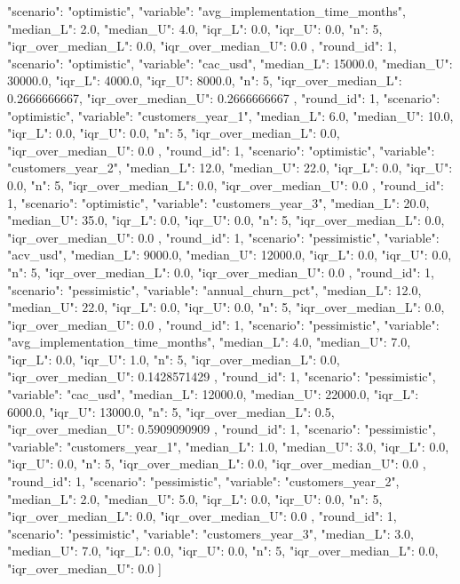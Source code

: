 \begin{APACode}
{    "scenario": "optimistic",
    "variable": "avg_implementation_time_months",
    "median_L": 2.0,
    "median_U": 4.0,
    "iqr_L": 0.0,
    "iqr_U": 0.0,
    "n": 5,
    "iqr_over_median_L": 0.0,
    "iqr_over_median_U": 0.0
  },
  {
    "round_id": 1,
    "scenario": "optimistic",
    "variable": "cac_usd",
    "median_L": 15000.0,
    "median_U": 30000.0,
    "iqr_L": 4000.0,
    "iqr_U": 8000.0,
    "n": 5,
    "iqr_over_median_L": 0.2666666667,
    "iqr_over_median_U": 0.2666666667
  },
  {
    "round_id": 1,
    "scenario": "optimistic",
    "variable": "customers_year_1",
    "median_L": 6.0,
    "median_U": 10.0,
    "iqr_L": 0.0,
    "iqr_U": 0.0,
    "n": 5,
    "iqr_over_median_L": 0.0,
    "iqr_over_median_U": 0.0
  },
  {
    "round_id": 1,
    "scenario": "optimistic",
    "variable": "customers_year_2",
    "median_L": 12.0,
    "median_U": 22.0,
    "iqr_L": 0.0,
    "iqr_U": 0.0,
    "n": 5,
    "iqr_over_median_L": 0.0,
    "iqr_over_median_U": 0.0
  },
  {
    "round_id": 1,
    "scenario": "optimistic",
    "variable": "customers_year_3",
    "median_L": 20.0,
    "median_U": 35.0,
    "iqr_L": 0.0,
    "iqr_U": 0.0,
    "n": 5,
    "iqr_over_median_L": 0.0,
    "iqr_over_median_U": 0.0
  },
  {
    "round_id": 1,
    "scenario": "pessimistic",
    "variable": "acv_usd",
    "median_L": 9000.0,
    "median_U": 12000.0,
    "iqr_L": 0.0,
    "iqr_U": 0.0,
    "n": 5,
    "iqr_over_median_L": 0.0,
    "iqr_over_median_U": 0.0
  },
  {
    "round_id": 1,
    "scenario": "pessimistic",
    "variable": "annual_churn_pct",
    "median_L": 12.0,
    "median_U": 22.0,
    "iqr_L": 0.0,
    "iqr_U": 0.0,
    "n": 5,
    "iqr_over_median_L": 0.0,
    "iqr_over_median_U": 0.0
  },
  {
    "round_id": 1,
    "scenario": "pessimistic",
    "variable": "avg_implementation_time_months",
    "median_L": 4.0,
    "median_U": 7.0,
    "iqr_L": 0.0,
    "iqr_U": 1.0,
    "n": 5,
    "iqr_over_median_L": 0.0,
    "iqr_over_median_U": 0.1428571429
  },
  {
    "round_id": 1,
    "scenario": "pessimistic",
    "variable": "cac_usd",
    "median_L": 12000.0,
    "median_U": 22000.0,
    "iqr_L": 6000.0,
    "iqr_U": 13000.0,
    "n": 5,
    "iqr_over_median_L": 0.5,
    "iqr_over_median_U": 0.5909090909
  },
  {
    "round_id": 1,
    "scenario": "pessimistic",
    "variable": "customers_year_1",
    "median_L": 1.0,
    "median_U": 3.0,
    "iqr_L": 0.0,
    "iqr_U": 0.0,
    "n": 5,
    "iqr_over_median_L": 0.0,
    "iqr_over_median_U": 0.0
  },
  {
    "round_id": 1,
    "scenario": "pessimistic",
    "variable": "customers_year_2",
    "median_L": 2.0,
    "median_U": 5.0,
    "iqr_L": 0.0,
    "iqr_U": 0.0,
    "n": 5,
    "iqr_over_median_L": 0.0,
    "iqr_over_median_U": 0.0
  },
  {
    "round_id": 1,
    "scenario": "pessimistic",
    "variable": "customers_year_3",
    "median_L": 3.0,
    "median_U": 7.0,
    "iqr_L": 0.0,
    "iqr_U": 0.0,
    "n": 5,
    "iqr_over_median_L": 0.0,
    "iqr_over_median_U": 0.0
  }
]
\end{APACode}

